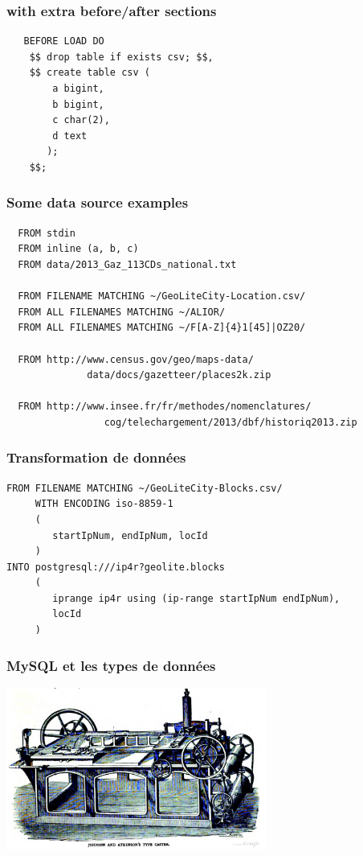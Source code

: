 \documentclass{beamer}
\begin{document}
\begin{frame}[fragile]
  \frametitle{with extra before/after sections}

  \begin{verbatim}
   BEFORE LOAD DO
    $$ drop table if exists csv; $$,
    $$ create table csv (
        a bigint,
        b bigint,
        c char(2),
        d text
       );
    $$;
  \end{verbatim}
\end{frame}

\begin{frame}[fragile]
  \frametitle{Some data source examples}

  \begin{verbatim}
  FROM stdin
  FROM inline (a, b, c)
  FROM data/2013_Gaz_113CDs_national.txt
  
  FROM FILENAME MATCHING ~/GeoLiteCity-Location.csv/
  FROM ALL FILENAMES MATCHING ~/ALIOR/
  FROM ALL FILENAMES MATCHING ~/F[A-Z]{4}1[45]|OZ20/
  
  FROM http://www.census.gov/geo/maps-data/
              data/docs/gazetteer/places2k.zip
  
  FROM http://www.insee.fr/fr/methodes/nomenclatures/
                 cog/telechargement/2013/dbf/historiq2013.zip
\end{verbatim}
\end{frame}

\begin{frame}[fragile]
  \frametitle{Transformation de données}

  \begin{verbatim}
FROM FILENAME MATCHING ~/GeoLiteCity-Blocks.csv/
     WITH ENCODING iso-8859-1
     (
        startIpNum, endIpNum, locId
     )
INTO postgresql:///ip4r?geolite.blocks
     (
        iprange ip4r using (ip-range startIpNum endIpNum),
        locId
     )
  \end{verbatim}
\end{frame}

\begin{frame}
  \frametitle{MySQL et les types de données}

  
  \begin{center}
    \includegraphics[height=2.1in]{type-casting-machine.jpg}
  \end{center}
\end{frame}
\end{document}
